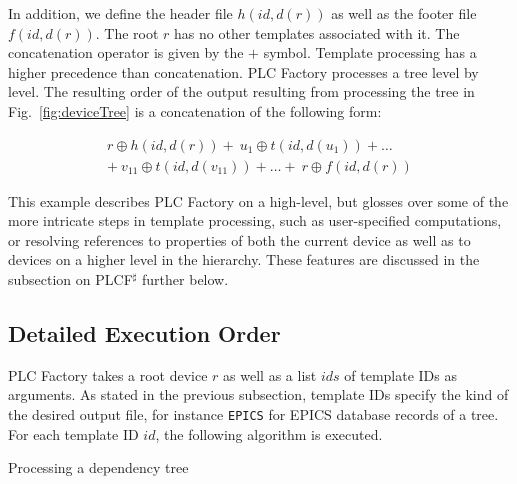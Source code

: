 \documentclass[a4paper,
              ]{jacow}
\begin{document}
In addition, we define the header file $h(\mathit{id}, d(r))$ as well as the footer file $f(\mathit{id}, d(r))$. The root $r$ has no other templates associated with it. The concatenation operator is given by the $+$ symbol. Template processing has a higher precedence than concatenation. PLC Factory processes a tree level by level. The resulting order of the output resulting from processing the tree in Fig.\ \ref{fig:deviceTree} is a concatenation of the following form:

\begin{multline}
      r          \oplus h(\mathit{id}, d(r))
+ \  u_1     \oplus t(\mathit{id}, d(u_1))       +  \dots  \\
+ \  v_{11} \oplus t(\mathit{id}, d(v_{11}))   +  \dots + \ r  \oplus f(\mathit{id}, d(r))      
\end{multline}

This example describes PLC Factory on a high-level, but glosses over some of the more intricate steps in template processing, such as user-specified computations, or resolving references to properties of both the current device as well as to devices on a higher level in the hierarchy. These features are discussed in the subsection on PLCF$^\sharp$ further below.

\subsection{Detailed Execution Order}
PLC Factory takes a root device $r$ as well as a list $\mathit{ids}$ of template IDs as arguments. As stated in the previous subsection, template IDs specify the kind of the desired output file, for instance \texttt{EPICS} for EPICS database records of a tree. For each template ID $id$, the following algorithm is executed. 

\begin{algorithm}
 \label{alg:algo}
 \caption{Processing a dependency tree}
\end{algorithm}
\end{document}
